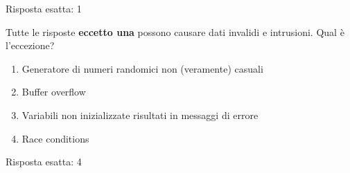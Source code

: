 \begin{Answer} [
  ref={esControlli10},
  number={10}
  ]

  \Question Risposta esatta: 1
\end{Answer}


\begin{Exercise} [
  title={Quiz},
  label={esControlli11}
  ]

  \Question Tutte le risposte \textbf{eccetto una} possono causare dati
  invalidi e intrusioni. Qual è l'eccezione?
\begin{enumerate}
 \item Generatore di numeri randomici non (veramente) casuali
 \item Buffer overflow
 \item Variabili non inizializzate risultati in messaggi di errore
 \item Race conditions
\end{enumerate}

\end{Exercise}

\begin{Answer} [
  ref={esControlli11},
  number={11}
  ]

  \Question Risposta esatta: 4
\end{Answer}
